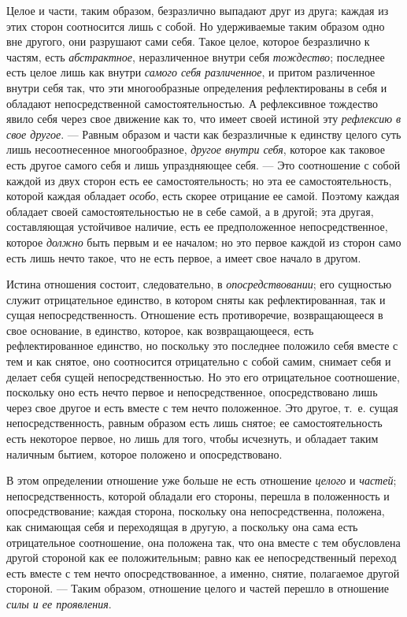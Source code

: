 Целое и части, таким образом, безразлично выпадают друг из друга; каждая из
этих сторон соотносится лишь с собой. Но удерживаемые таким образом одно
вне другого, они разрушают сами себя. Такое целое, которое безразлично к
частям, есть {\em абстрактное}, неразличенное внутри
себя {\em тождество}; последнее есть целое лишь как
внутри {\em самого себя различенное}, и притом
различенное внутри себя так, что эти многообразные определения
рефлектированы в себя и обладают непосредственной самостоятельностью. А
рефлексивное тождество явило себя через свое движение как то, что имеет
своей истиной эту {\em рефлексию в свое другое}. —
Равным образом и части как безразличные к единству целого суть лишь
несоотнесенное многообразное, {\em другое внутри себя},
которое как таковое есть другое самого себя и лишь упраздняющее себя. — Это
соотношение с собой каждой из двух сторон есть ее самостоятельность; но эта
ее самостоятельность, которой каждая обладает
{\em особо}, есть скорее отрицание ее самой. Поэтому
каждая обладает своей самостоятельностью не в себе самой, а в другой; эта
другая, составляющая устойчивое наличие, есть ее предположенное
непосредственное, которое {\em должно} быть первым и ее
началом; но это первое каждой из сторон само есть лишь нечто такое, что не
есть первое, а имеет свое начало в другом.

Истина отношения состоит, следовательно, в
{\em опосредствовании}; его сущностью служит
отрицательное единство, в котором сняты как рефлектированная, так и сущая
непосредственность. Отношение есть противоречие, возвращающееся в свое
основание, в единство, которое, как возвращающееся, есть рефлектированное
единство, но поскольку это последнее положило себя вместе с тем и как
снятое, оно соотносится отрицательно с собой самим, снимает себя и делает
себя сущей непосредственностью. Но это его отрицательное соотношение,
поскольку оно есть нечто первое и непосредственное, опосредствовано лишь
через свое другое и есть вместе с тем нечто положенное. Это другое, т.~е.
сущая непосредственность, равным образом есть лишь снятое; ее
самостоятельность есть некоторое первое, но лишь для того, чтобы исчезнуть,
и обладает таким наличным бытием, которое положено и опосредствовано.

В этом определении отношение уже больше не есть отношение
{\em целого} и {\em частей};
непосредственность, которой обладали его стороны, перешла в положенность и
опосредствование; каждая сторона, поскольку она непосредственна, положена,
как снимающая себя и переходящая в другую, а поскольку она сама есть
отрицательное соотношение, она положена так, что она вместе с тем
обусловлена другой стороной как ее положительным; равно как ее
непосредственный переход есть вместе с тем нечто опосредствованное, а
именно, снятие, полагаемое другой стороной. — Таким образом, отношение
целого и частей перешло в отношение {\em силы и ее
проявления}.


